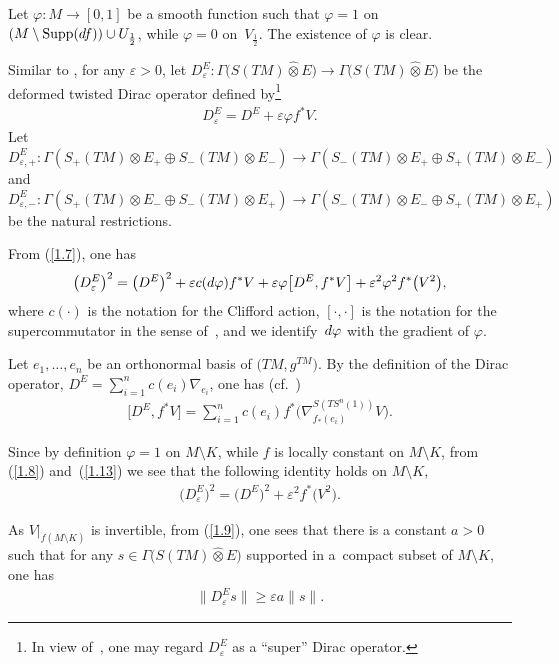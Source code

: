 \documentclass[11pt]{article}
\numberwithin{equation}{section}
\numberwithin{equation}{section}
\theoremstyle{definition}
\begin{document}
Let $\varphi\colon M\rightarrow [0,1]$ be a smooth function such that $\varphi=1$ on $(M\setminus \operatorname{Supp}({\rm d}f) )\cup U_{\frac{1}{2}}$, while $\varphi=0$ on~$V_{\frac{1}{2}}$. The existence of $\varphi$ is clear.

Similar to \cite[equation~(1.11)]{Z19}, for any $\varepsilon>0$, let $D^E_\varepsilon\colon \Gamma\big(S(TM)\widehat\otimes E\big)\rightarrow
\Gamma\big(S(TM)\widehat\otimes E\big)$ be the deformed twisted Dirac operator defined by\footnote{In view of~\cite{Q85}, one may regard $D^E_\varepsilon$ as a ``super'' Dirac operator.}
\begin{gather}\label{1.7}
D^E_\varepsilon =D^E+\varepsilon \varphi f^*V.
\end{gather}
Let $D^E_{\varepsilon,+}\colon \Gamma(S_+(TM) \otimes E_+\oplus S_-(TM)\otimes E_-) \rightarrow \Gamma(S_-(TM) \otimes E_+\oplus S_+(TM)\otimes E_-) $ and $D^E_{\varepsilon,-}\colon \Gamma(S_+(TM) \otimes E_-\oplus S_-(TM)\otimes E_+) \rightarrow \Gamma(S_-(TM) \otimes E_-\oplus S_+(TM)\otimes E_+) $ be the natural restrictions.

From (\ref{1.7}), one has
\begin{gather}\label{1.8}
\big(D^E_\varepsilon\big)^2 =\big(D^E\big)^2+\varepsilon c({\rm d}\varphi) f^*V
+\varepsilon \varphi\big[D^E,f^*V\big]+\varepsilon^2\varphi^2f^*\big(V^2\big),
\end{gather}
where $c(\cdot)$ is the notation for the Clifford action, $[\cdot,\cdot]$ is the notation for the supercommutator in the sense of~\cite{Q85}, and we identify~${\rm d}\varphi$ with the gradient of $\varphi$.

Let $e_1, \dots, e_n$ be an orthonormal basis of $\big(TM,g^{TM}\big)$. By the definition of the Dirac operator, $D^E=\sum\limits_{i=1}^n c(e_i)\nabla_{e_i}$, one has (cf.~\cite{Z19})
\begin{gather}\label{1.13}
\big[D^E,f^*V\big] =\sum_{i=1}^nc (e_i ) f^* \big(\nabla^{S(TS^n(1))}_{f_*(e_i)}V\big).
\end{gather}

Since by definition $\varphi=1$ on $M\setminus K$, while $f$ is locally constant on $M\setminus K $, from (\ref{1.8}) and~(\ref{1.13}) we see that the following identity holds on $M\setminus K$,
\begin{gather}\label{1.9}
\big(D^E_\varepsilon\big)^2 =\big(D^E\big)^2 +\varepsilon^2 f^*\big(V ^2\big).
\end{gather}

As $V|_{ {f(M\setminus K)}}$ is invertible, from (\ref{1.9}), one sees that there is a constant $a>0$ such that for any $s\in \Gamma\big(S(TM)\widehat\otimes E\big)$ supported in a~compact subset of $M\setminus K$, one has
\begin{gather}\label{1.10}
\big\|D^E_\varepsilon s\big\| \geq \varepsilon a \|s\|.
\end{gather}
\end{document}
